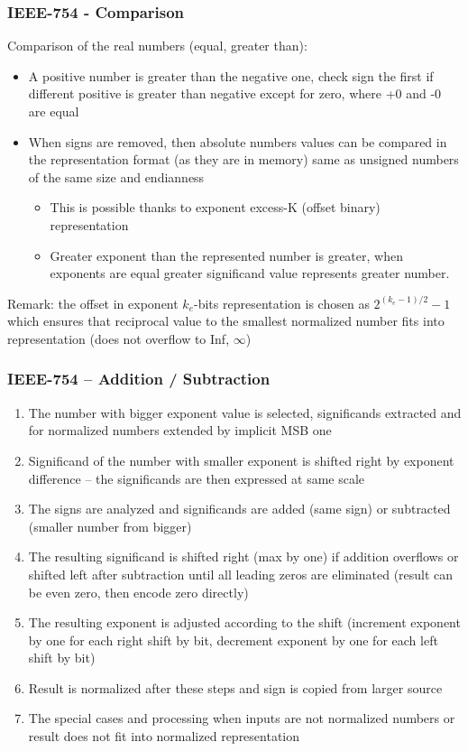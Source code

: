 \documentclass{beamer}
\begin{document}
\begin{frame}
\frametitle{IEEE-754 - Comparison}

Comparison of the real numbers (equal, greater than):
\begin{itemize}
\item A positive number is greater than the negative one, check sign the first if different positive is greater than negative except for zero, where +0 and -0 are equal
\item When signs are removed, then absolute numbers values can be compared in the representation format (as they are in memory) same as unsigned numbers of the same size and endianness
\begin{itemize}
\item This is possible thanks to exponent excess-K (offset binary) representation
\item Greater exponent than the represented number is greater, when exponents are equal greater significand value represents greater number.
\end{itemize}
\end{itemize}
\bigskip
Remark: the offset in exponent $k_e$-bits representation is chosen as $2^{(k_e-1)/2}-1$ which ensures that reciprocal value to the smallest normalized number fits into representation (does not overflow to Inf, $\infty$)

\end{frame}


\begin{frame}
\frametitle{IEEE-754 -- Addition / Subtraction}

\begin{enumerate}
\item The number with bigger exponent value is selected, significands extracted and for normalized numbers extended by implicit MSB one
\item Significand of the number with smaller exponent is shifted right by exponent difference -- the significands are then expressed at same scale
\item The signs are analyzed and significands are added (same sign) or subtracted (smaller number from bigger)
\item The resulting significand is shifted right (max by one) if addition overflows or shifted left after subtraction until all leading zeros are eliminated (result can be even zero, then encode zero directly)
\item The resulting exponent is adjusted according to the shift (increment exponent by one for each right shift by bit, decrement exponent by one for each left shift by bit)
\item Result is normalized after these steps and sign is copied from larger source
\item The special cases and processing when inputs are not normalized numbers or result does not fit into normalized representation 
\end{enumerate}

\end{frame}
\end{document}

